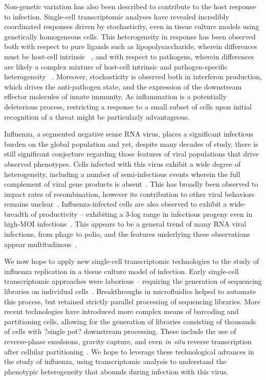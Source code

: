 \documentclass[9pt,lineno]{elife}
\begin{document}
Non-genetic variation has also been described to contribute to the host response to infection. 
Single-cell transcriptomic analyses have revealed incredibly coordinated responses driven by stochasticity, even in tissue culture models using genetically homogeneous cells.
This heterogeneity in response has been observed both with respect to pure ligands such as lipopolysaccharide, wherein differences must be host-cell intrinsic ~\citep{Shalek:2014ey,Shalek:2013ej,Rand:2012kl}, and with respect to pathogens, wherein differences are likely a complex mixture of host-cell intrinsic and pathogen-specific heterogeneity ~\citep{Avraham:2015cj}. 
Moreover, stochasticity is observed both in interferon production, which drives the anti-pathogen state, and the expression of the downstream effector molecules of innate immunity.
As inflammation is a potentially deleterious process, restricting a response to a small subset of cells upon initial recognition of a threat might be particularly advantageous.

Influenza, a segmented negative sense RNA virus, places a significant infectious burden on the global population and yet, despite many decades of study, there is still significant conjecture regarding those features of viral populations that drive observed phenotypes.
Cells infected with this virus exhibit a wide degree of heterogeneity, including a number of semi-infectious events wherein the full complement of viral gene products is absent~\citep{Brooke:2013kb, Heldt:2015iz,Dou:2017cp}.
This has broadly been observed to impact rates of recombination, however its contribution to other viral behaviors remains unclear~\citep{Fonville:2015cg}. 
Influenza-infected cells are also observed to exhibit a wide-breadth of productivity -- exhibiting a 3-log range in infectious progeny even in high-MOI infections~\citep{Heldt:2015iz}. 
This appears to be a general trend of many RNA viral infections, from phage to polio, and the features underlying these observations appear multitudinous~\citep{DELBRUCK:1945wo, Schulte:2014br}. 

We now hope to apply new single-cell transcriptomic technologies to the study of influenza replication in a tissue culture model of infection.
Early single-cell transcriptomic approaches were laborious -- requiring the generation of sequencing libraries on individual cells~\citep{Tang:2009kj,ld:2012gj}.
Breakthroughs in microfluidics helped to automate this process, but retained strictly parallel processing of sequencing libraries.
More recent technologies have introduced more complex means of barcoding and partitioning cells, allowing for the generation of libraries consisting of thousands of cells with ?single pot? downstream processing.
These include the use of reverse-phase emulsions, gravity capture, and even \emph{in situ} reverse transcription after cellular partitioning~\citep{JunSSi,Gierahn:2017bc,Klein:2015ki,Macosko:2015ht}. 
We hope to leverage these technological advances in the study of influenza, using transcriptomic analysis to understand the phenotypic heterogeneity that abounds during infection with this virus. 
\end{document}

